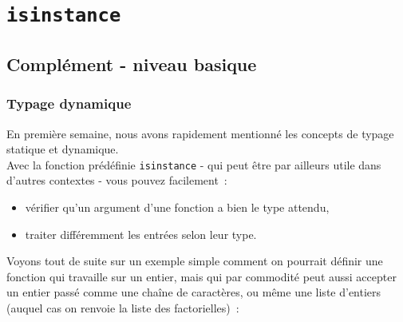     \hypertarget{isinstance}{%
\section{\texorpdfstring{\texttt{isinstance}}{isinstance}}\label{isinstance}}

    \hypertarget{compluxe9ment---niveau-basique}{%
\subsection{Complément - niveau
basique}\label{compluxe9ment---niveau-basique}}

    \hypertarget{typage-dynamique}{%
\subsubsection{Typage dynamique}\label{typage-dynamique}}

    En première semaine, nous avons rapidement mentionné les concepts de
typage statique et dynamique.\\

Avec la fonction prédéfinie \texttt{isinstance} - qui peut être par
ailleurs utile dans d'autres contextes - vous pouvez facilement~:

\begin{itemize}
	\item 
	vérifier qu'un argument d'une fonction a bien le type attendu,
	\item
	traiter différemment les entrées selon leur type.
\end{itemize}

    Voyons tout de suite sur un exemple simple comment on pourrait définir
une fonction qui travaille sur un entier, mais qui par commodité peut
aussi accepter un entier passé comme une chaîne de caractères, ou même
une liste d'entiers (auquel cas on renvoie la liste des factorielles)~:

